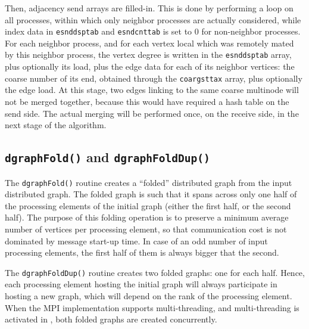 Then, adjacency send arrays are filled-in. This is done by performing
a loop on all processes, within which only neighbor processes are
actually considered, while index data in \texttt{esnddsptab} and
\texttt{esndcnttab} is set to $0$ for non-neighbor processes. For each
neighbor process, and for each vertex local which was remotely mated
by this neighbor process, the vertex degree is written in the
\texttt{esnddsptab} array, plus optionally its load, plus the edge
data for each of its neighbor vertices: the coarse number of its end,
obtained through the \texttt{coargsttax} array, plus optionally the
edge load. At this stage, two edges linking to the same coarse
multinode will not be merged together, because this would have
required a hash table on the send side. The actual merging will be
performed once, on the receive side, in the next stage of the
algorithm.

\subsection{\texttt{dgraphFold()} and \texttt{dgraphFoldDup()}}

The \texttt{dgraph\lbt Fold()} routine creates a ``folded''
distributed graph from the input distributed graph. The folded graph
is such that it spans across only one half of the processing elements
of the initial graph (either the first half, or the second half). The
purpose of this folding operation is to preserve a minimum average
number of vertices per processing element, so that communication cost
is not dominated by message start-up time. In case of an odd number
of input processing elements, the first half of them is always bigger
that the second.

The \texttt{dgraph\lbt Fold\lbt Dup()} routine creates two folded
graphs: one for each half. Hence, each processing element hosting the
initial graph will always participate in hosting a new graph, which
will depend on the rank of the processing element. When the MPI
implementation supports multi-threading, and multi-threading is
activated in \scotch, both folded graphs are created concurrently.

